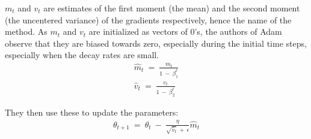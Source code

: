 $m_t$ and $v_t$ are estimates of the first moment (the mean) and the second moment (the uncentered variance) of the gradients respectively, hence the name of the method. As $m_t$ and $v_t$ are initialized as vectors of 0's, the authors of Adam observe that they are biased towards zero, especially during the initial time steps, especially when the decay rates are small.
\begin{align}
    \hat{m}_t \: = \: \frac{m_t}{1\:-\:\beta^t_1} \\
 \hat{v}_t \: = \: \frac{v_t}{1\: - \: \beta^t_2}
\end{align}



They then use these to update the parameters:
\begin{align}
\theta_{t+1} \: = \: \theta_t \: - \: \frac{\eta}{\sqrt{\hat{v}_t} \: +\: \epsilon} \hat{m}_t 
\end{align}
	

	
